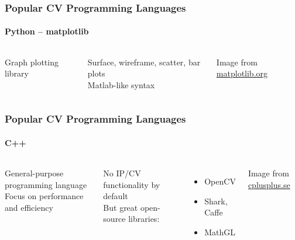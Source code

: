 \documentclass[xetex,professionalfont]{beamer}
\begin{document}

\begin{frame}
\frametitle{Popular CV Programming Languages}
\framesubtitle{Python -- matplotlib}

\begin{columns}

Graph plotting library

\bigskip
Surface, wireframe, scatter, bar plots\\\medskip
Matlab-like syntax


\begin{center}
{
	{\centering Image from \url{matplotlib.org}}}
\end{center}

\end{columns}

\end{frame}


\begin{frame}
\frametitle{Popular CV Programming Languages}
\framesubtitle{C++}

\begin{columns}

General-purpose programming language \\
Focus on performance and efficiency 

\bigskip
No IP/CV functionality by default \\
But great open-source libraries:
\begin{itemize}
	\item OpenCV
	\item Shark, Caffe
	\item MathGL
\end{itemize}


\begin{center}
{
	{\centering Image from \url{cplusplus.se}}}
\end{center}

\end{columns}

\end{frame}
\end{document}

